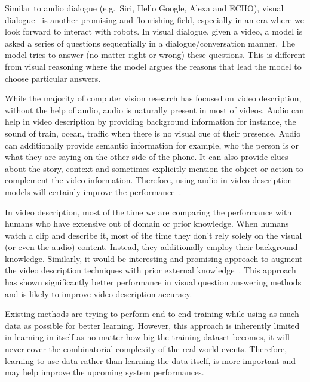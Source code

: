 \documentclass[10pt,journal,compsoc]{IEEEtran}
\begin{document}
\vspace{1mm}
Similar to audio dialogue (e.g.~Siri, Hello Google, Alexa and ECHO), visual dialogue~\cite{visualdialogue} is another promising and flourishing field, especially in an era where we look forward to interact with robots. In visual dialogue, given a video, a model is asked a series of questions sequentially in a dialogue/conversation manner. The model tries to answer (no matter right or wrong) these questions. This is different from visual reasoning where the model argues the reasons that lead the model to choose particular answers.


\vspace{1mm}
While the majority of computer vision research has focused on video description, without the help of audio, audio is naturally present in most of videos. Audio can help in video description by providing background information for instance, the sound of train, ocean, traffic when there is no visual cue of their presence. Audio can additionally provide semantic information for example, who the person is or what they are saying on the other side of the phone. It can also provide clues about the story, context and sometimes explicitly mention the object or action to complement the video information. Therefore, using audio in video description models will certainly improve the performance~\cite{audioviosionorallba, audiovisualefros}.

\vspace{1mm}
In video description, most of the time we are comparing the performance with humans who have extensive out of domain or prior knowledge. When humans watch a clip and describe it, most of the time they don't rely solely on the visual (or even the audio) content. Instead, they additionally employ their background knowledge. Similarly, it would be interesting and promising approach to augment the video description techniques with prior external knowledge~\cite{extknowlangvision}. This approach has shown significantly better performance in visual question answering methods and is likely to improve video description accuracy.

\vspace{1mm}
Existing methods are trying to perform end-to-end training while using as much data as possible for better learning. However, this approach is inherently limited in learning in itself as no matter how big the training dataset becomes, it will never cover the combinatorial complexity of the real world events. Therefore, learning to use data rather than learning the data itself, is more important and may help improve the upcoming system performances.
\end{document}
